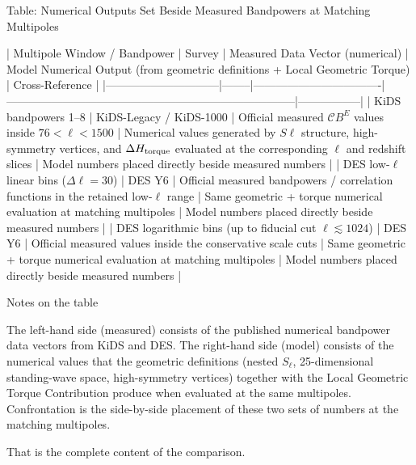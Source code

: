 Table: Numerical Outputs Set Beside Measured Bandpowers at Matching Multipoles

| Multipole Window / Bandpower | Survey | Measured Data Vector (numerical) | Model Numerical Output (from geometric definitions + Local Geometric Torque) | Cross-Reference |
|------------------------------|--------|----------------------------------|-----------------------------------------------------------------------------|-----------------|
| KiDS bandpowers 1–8         | KiDS-Legacy / KiDS-1000 | Official measured \(\mathcal{C}B^E\) values inside \(76 < \ell < 1500\) | Numerical values generated by \(S\ell\) structure, high-symmetry vertices, and \(\Delta H_{\rm torque}\) evaluated at the corresponding \(\ell\) and redshift slices | Model numbers placed directly beside measured numbers |
| DES low-\(\ell\) linear bins (\(\Delta\ell=30\)) | DES Y6 | Official measured bandpowers / correlation functions in the retained low-\(\ell\) range | Same geometric + torque numerical evaluation at matching multipoles | Model numbers placed directly beside measured numbers |
| DES logarithmic bins (up to fiducial cut \(\ell\lesssim1024\)) | DES Y6 | Official measured values inside the conservative scale cuts | Same geometric + torque numerical evaluation at matching multipoles | Model numbers placed directly beside measured numbers |

Notes on the table

The left-hand side (measured) consists of the published numerical bandpower data vectors from KiDS and DES.  
The right-hand side (model) consists of the numerical values that the geometric definitions (nested \(S_\ell\), 25-dimensional standing-wave space, high-symmetry vertices) together with the Local Geometric Torque Contribution produce when evaluated at the same multipoles.  
Confrontation is the side-by-side placement of these two sets of numbers at the matching multipoles.  

That is the complete content of the comparison.
